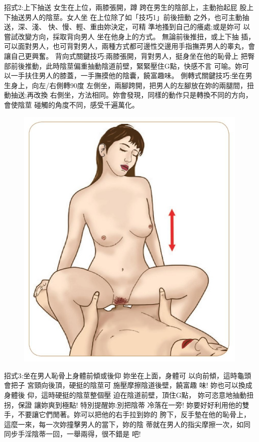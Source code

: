 \documentclass[12pt,UTF8]{ctexbook}
\begin{document}
招式2:上下抽送
女生在上位，兩膝張開，蹲
跨在男生的陰部上，主動抬起屁
股上下抽送男人的陰莖。女人坐
在上位除了如「技巧1」前後扭動
之外，也可主動抽送，深、淺、
快、慢、輕、重由妳決定，可精
準地搔到自己的癢處;或是妳可
以嘗試改變方向，採取背向男人
坐在他身上的方式。
無論前後推扭，或上下抽
插，可以面對男人，也可背對男人，兩種方式都可邊性交邊用手指撫弄男人的睾丸，會讓自己更興奮。
背向式關鍵技巧:兩膝張開，背對男人，挺身坐在他的恥骨上
把臀部前後推動，此時陰莖偏重抽動陰道前壁，緊緊壓住G點，快感不言
可喻。妳可以一手扶住男人的膝蓋，一手撫摸他的陰囊，饒富趣味。
側轉式關鍵技巧:坐在男生身上，向左/右側轉90度
左側坐，兩腳跨開，把男人的左腳放在妳的兩腿間，扭動抽送;再改換
右側坐，方法相同。妳會發現，同樣的動作只是轉換不同的方向，會使陰莖
碰觸的角度不同，感受千遍萬化。

\begin{figure}[htbp]
	\centering
	\includegraphics[width=0.7\linewidth]{25}
	\caption{}
	\label{fig:1}
\end{figure}

招式3:坐在男人恥骨上身體前傾或後仰
妳坐在上面，身體可
以向前傾，這時龜頭會把子
宮頸向後頂，硬挺的陰莖可
施壓摩擦陰道後壁，饒富趣
味!
妳也可以換成身體後
仰，這時硬挺的陰莖整個壓
迫在陰道前壁，頂住G點，
妳可恣意地抽動扭拐，保證
讓妳爽到極點!
特別提醒妳:別把陰蒂
冷落在一旁!
妳要好好利用他的雙手，不要讓它們閒著。妳可以把他的右手拉到妳的
胯下，反手墊在他的恥骨上，這麼一來，每一次妳撞擊男人的當下，妳的陰
蒂就在男人的指尖摩擦一次，如同同步手淫陰蒂一回，一舉兩得，很不錯是
吧!
\end{document}

